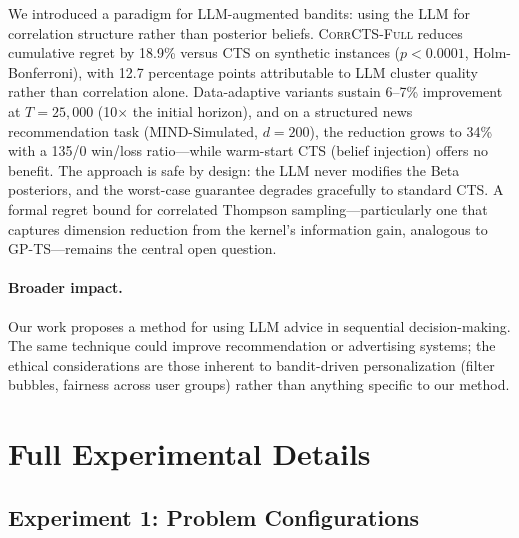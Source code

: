 \documentclass{article}
\theoremstyle{plain}
\theoremstyle{definition}
\theoremstyle{remark}
\newcommand{\CorrFull}{\textsc{CorrCTS-Full}}
\begin{document}
We introduced a paradigm for LLM-augmented bandits: using the LLM for correlation structure rather than posterior beliefs.
\CorrFull{} reduces cumulative regret by 18.9\% versus CTS on synthetic instances ($p < 0.0001$, Holm-Bonferroni), with 12.7 percentage points attributable to LLM cluster quality rather than correlation alone.
Data-adaptive variants sustain 6--7\% improvement at $T{=}25{,}000$ (10$\times$ the initial horizon), and on a structured news recommendation task (MIND-Simulated, $d{=}200$), the reduction grows to 34\% with a 135/0 win/loss ratio---while warm-start CTS (belief injection) offers no benefit.
The approach is safe by design: the LLM never modifies the Beta posteriors, and the worst-case guarantee degrades gracefully to standard CTS.
A formal regret bound for correlated Thompson sampling---particularly one that captures dimension reduction from the kernel's information gain, analogous to GP-TS---remains the central open question.

\paragraph{Broader impact.}
Our work proposes a method for using LLM advice in sequential decision-making.
The same technique could improve recommendation or advertising systems; the ethical considerations are those inherent to bandit-driven personalization (filter bubbles, fairness across user groups) rather than anything specific to our method.




\newpage
\appendix
\onecolumn

\section{Full Experimental Details}\label{app:details}

\subsection{Experiment 1: Problem Configurations}
\end{document}
